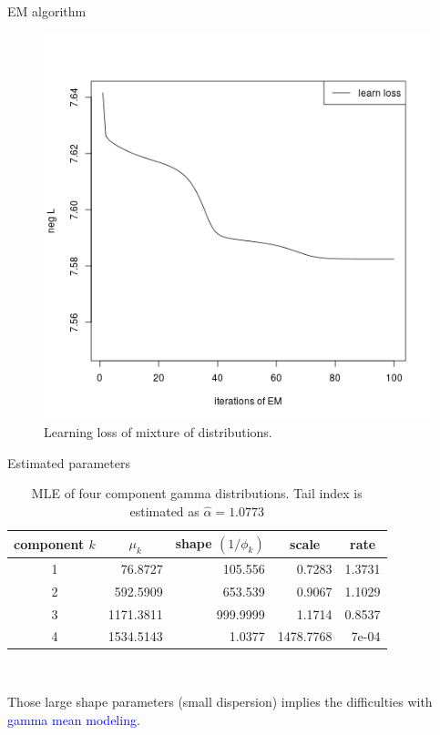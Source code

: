 \documentclass[professionalfont]{beamer}
\newcommand{\blue}[1]{\textcolor{blue}{#1}}
\begin{document}
\begin{frame}{EM algorithm}
	\begin{figure}[h!]
		\centering
		\includegraphics[width=0.35\linewidth]{../plots/sev/null_trace}
		\caption{Learning loss of mixture of distributions.}\label{null_sev}
	\end{figure}
\end{frame}

\begin{frame}{Estimated parameters}	\begin{table}[h!]
		\centering
		\caption{MLE of four component gamma distributions. Tail index is estimated as $\hat{\alpha}=1.0773$}\label{null-gamma}
		\begin{tabular}{crrrr}
			\hline
			component $k$ & \multicolumn{1}{c}{$\mu_k$} & \multicolumn{1}{c}{shape $(1/\phi_k)$} & \multicolumn{1}{c}{scale} & \multicolumn{1}{c}{rate} \\ \hline
			1         & 76.8727                & 105.556                   & 0.7283                    & 1.3731                   \\
			2         & 592.5909               & 653.539                   & 0.9067                    & 1.1029                   \\
			3         & 1171.3811              & 999.9999                  & 1.1714                    & 0.8537                   \\
			4         & 1534.5143              & 1.0377                    & 1478.7768                 & 7e-04                    \\ \hline
		\end{tabular}
	\end{table}

~

Those large shape parameters (small dispersion) implies the difficulties with \blue{gamma mean modeling}.
\end{frame}
\end{document}
